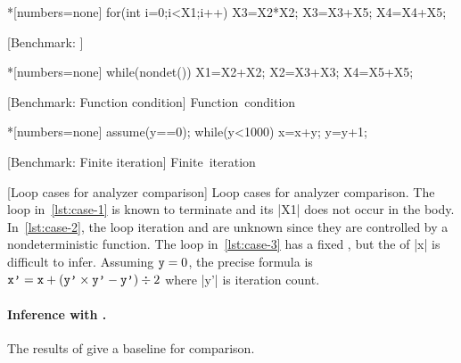 \begin{center}
\captionsetup{type=figure}
\begin{minipage}{\textwidth}
\begin{minipage}[t]{.33\textwidth}
\begin{implisting}*[numbers=none]
for(int i=0;i<X1;i++)
{ X3=X2*X2;
  X3=X3+X5;
  X4=X4+X5; }
\end{implisting}
[Benchmark: \explain]{\mbox{\explain}}
\label{lst:case-1}
\end{minipage}\hfill%
\begin{minipage}[t]{.33\textwidth}
\begin{implisting}*[numbers=none]
while(nondet())
{ X1=X2+X2;
  X2=X3+X3;
  X4=X5+X5; }
\end{implisting}
[Benchmark: Function condition]
{\mbox{Function condition}}
\label{lst:case-2}
\end{minipage}\hfill%
\begin{minipage}[t]{.3\textwidth}
\begin{implisting}*[numbers=none]
assume(y==0);
while(y<1000)
{ x=x+y;
  y=y+1; }
\end{implisting}
[Benchmark: Finite iteration]
{\mbox{Finite iteration}}
\label{lst:case-3}
\end{minipage}
\end{minipage}
[Loop cases for analyzer comparison]{
Loop cases for analyzer comparison. The loop in~\ref{lst:case-1} is known to
terminate and its  \pr|X1| does not occur in the body.
In~\ref{lst:case-2}, the loop iteration and  are unknown since
they are controlled by a nondeterministic function. The
loop in~\ref{lst:case-3} has a fixed , but the
 of \pr|x| is difficult to infer. Assuming \(\prm{y}=0\), the
precise formula is \(\prm{x'} = \prm{x} + (\prm{y'} \times \prm{y'} - \prm{y'})
\div 2\) where \pr|y'| is iteration count.
}\label{fig:loops}
\end{center}

\paragraph{Inference with \impl.}
The results of \ndx{\impl} give a baseline for comparison.


